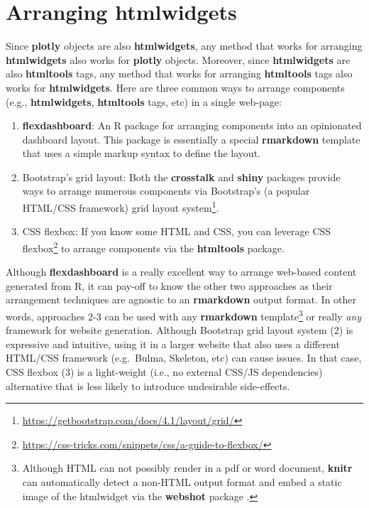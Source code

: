 \documentclass[
  12pt,
]{krantz}
\providecommand{\tightlist}{%
  \setlength{\itemsep}{0pt}\setlength{\parskip}{0pt}}
\renewcommand{\href}[2]{#2\footnote{\url{#1}}}
\begin{document}
\hypertarget{arranging-htmlwidgets}{%
\section{Arranging htmlwidgets}\label{arranging-htmlwidgets}}

Since \textbf{plotly} objects are also \textbf{htmlwidgets}, any method that works for arranging \textbf{htmlwidgets} also works for \textbf{plotly} objects. Moreover, since \textbf{htmlwidgets} are also \textbf{htmltools} tags, any method that works for arranging \textbf{htmltools} tags also works for \textbf{htmlwidgets}. Here are three common ways to arrange components (e.g., \textbf{htmlwidgets}, \textbf{htmltools} tags, etc) in a single web-page:

\begin{enumerate}
\def\labelenumi{\arabic{enumi}.}
\tightlist
\item
  \textbf{flexdashboard}: An R package for arranging components into an opinionated dashboard layout. This package is essentially a special \textbf{rmarkdown} template that uses a simple markup syntax to define the layout.
\item
  Bootstrap's grid layout: Both the \textbf{crosstalk} and \textbf{shiny} packages provide ways to arrange numerous components via Bootstrap's (a popular HTML/CSS framework) \href{https://getbootstrap.com/docs/4.1/layout/grid/}{grid layout system}.
\item
  CSS flexbox: If you know some HTML and CSS, you can leverage \href{https://css-tricks.com/snippets/css/a-guide-to-flexbox/}{CSS flexbox} to arrange components via the \textbf{htmltools} package.
\end{enumerate}

Although \textbf{flexdashboard} is a really excellent way to arrange web-based content generated from R, it can pay-off to know the other two approaches as their arrangement techniques are agnostic to an \textbf{rmarkdown} output format. In other words, approaches 2-3 can be used with any \textbf{rmarkdown} template\footnote{Although HTML can not possibly render in a pdf or word document, \textbf{knitr} can automatically detect a non-HTML output format and embed a static image of the htmlwidget via the \textbf{webshot} package \citep{webshot}.} or really \emph{any} framework for website generation. Although Bootstrap grid layout system (2) is expressive and intuitive, using it in a larger website that also uses a different HTML/CSS framework (e.g.~Bulma, Skeleton, etc) can cause issues. In that case, CSS flexbox (3) is a light-weight (i.e., no external CSS/JS dependencies) alternative that is less likely to introduce undesirable side-effects.
\end{document}
